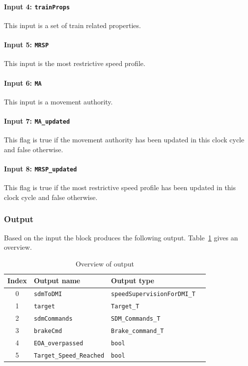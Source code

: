 \paragraph{Input 4: \texttt{trainProps}}
This input is a set of train related properties.
\paragraph{Input 5: \texttt{MRSP}}
This input is the most restrictive speed profile.
\paragraph{Input 6: \texttt{MA}}
This input is a movement authority.
\paragraph{Input 7: \texttt{MA\_updated}}
This flag is true if the movement authority has been updated in this clock cycle and false otherwise.
\paragraph{Input 8: \texttt{MRSP\_updated}}
This flag is true if the most restrictive speed profile has been updated in this clock cycle and false otherwise.



\subsubsection{Output}
Based on the input the block produces the following output. Table~\ref{tbl:speedsupervisionOutput} gives an overview.

\begin{table}[H]
  \begin{tabular}{| c | l | l | l |}
    \hline
    \textbf{Index} & \textbf{Output name} & \textbf{Output type}\\ \hline
    0 & \texttt{sdmToDMI} & \texttt{speedSupervisionForDMI\_T}\\
    1 & \texttt{target} & \texttt{Target\_T}\\
    2 & \texttt{sdmCommands} & \texttt{SDM\_Commands\_T}\\
    3 & \texttt{brakeCmd} & \texttt{Brake\_command\_T}\\
    4 & \texttt{EOA\_overpassed} & \texttt{bool}\\
    5 & \texttt{Target\_Speed\_Reached} & \texttt{bool}\\
    \hline
  \end{tabular} 
  \caption{Overview of output}
  \label{tbl:speedsupervisionOutput}
\end{table}

